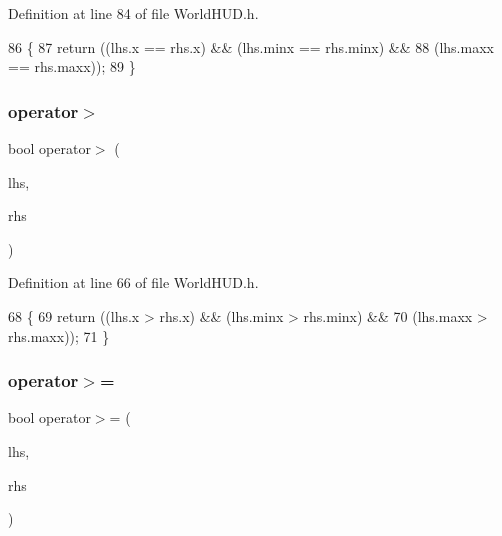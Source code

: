 Definition at line 84 of file World\+H\+U\+D.\+h.


\begin{DoxyCode}
86     \{
87       \textcolor{keywordflow}{return} ((lhs.x == rhs.x) && (lhs.minx == rhs.minx) &&
88               (lhs.maxx == rhs.maxx));
89     \}
\end{DoxyCode}
\mbox{\label{structnjli_1_1_j_l_i_glyph_position_a9becd8eef286422eab003470608064be}} 
\subsubsection{\texorpdfstring{operator$>$}{operator>}}
{\footnotesize\ttfamily bool operator$>$ (\begin{DoxyParamCaption}\item[{const \mbox{\hyperlink{structnjli_1_1_j_l_i_glyph_position}{J\+L\+I\+Glyph\+Position}} \&}]{lhs,  }\item[{const \mbox{\hyperlink{structnjli_1_1_j_l_i_glyph_position}{J\+L\+I\+Glyph\+Position}} \&}]{rhs }\end{DoxyParamCaption})\hspace{0.3cm}{\ttfamily [friend]}}



Definition at line 66 of file World\+H\+U\+D.\+h.


\begin{DoxyCode}
68     \{
69       \textcolor{keywordflow}{return} ((lhs.x > rhs.x) && (lhs.minx > rhs.minx) &&
70               (lhs.maxx > rhs.maxx));
71     \}
\end{DoxyCode}
\mbox{\label{structnjli_1_1_j_l_i_glyph_position_aa3fc3849f99bd39c429f75f9f2fd65ea}} 
\subsubsection{\texorpdfstring{operator$>$=}{operator>=}}
{\footnotesize\ttfamily bool operator$>$= (\begin{DoxyParamCaption}\item[{const \mbox{\hyperlink{structnjli_1_1_j_l_i_glyph_position}{J\+L\+I\+Glyph\+Position}} \&}]{lhs,  }\item[{const \mbox{\hyperlink{structnjli_1_1_j_l_i_glyph_position}{J\+L\+I\+Glyph\+Position}} \&}]{rhs }\end{DoxyParamCaption})\hspace{0.3cm}{\ttfamily [friend]}}



